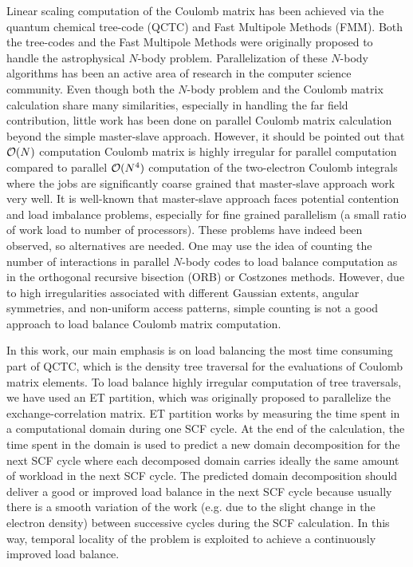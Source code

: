\commentoutA{\documentclass[prl,aps,twocolumn,twocolumngrid,superbib]{revtex4}}
\begin{document}
Linear scaling computation of the Coulomb matrix has been achieved via
the quantum chemical tree-code
(QCTC)\cite{MChallacombe96,MChallacombe96B,MChallacombe97} and Fast
Multipole Methods (FMM)\cite{CWhite94B,CWhite96A,MStrain96}.  Both the
tree-codes\cite{JBarnes86} and the Fast Multipole
Methods\cite{LGreengard87,CRAnderson92} were originally proposed to
handle the astrophysical $N$-body problem.  Parallelization of these
$N$-body algorithms has been an active area of research in the
computer science
community\cite{MWarren92,AGrama94,MWarren95b,Singh93,Singh_95v27,YHu96,Grama_98v24,PGibbon02,Antonuccio-Delogu03}.
Even though both the $N$-body problem and the Coulomb matrix
calculation share many similarities, especially in handling the far
field contribution, little work has been done on parallel Coulomb
matrix calculation beyond the simple master-slave
approach\cite{Sosa_98v19,Furlani_00v128,Sosa_00v26}.  However, it
should be pointed out that ${\cal O}(N)$ computation Coulomb matrix is
highly irregular for parallel computation compared to parallel ${\cal
O}(N^4)$ computation of the two-electron Coulomb integrals where the
jobs are significantly coarse grained that master-slave approach work
very well.  It is well-known that master-slave approach faces
potential contention and load imbalance
problems\cite{BWilkinson99,GWilson95}, especially for fine grained
parallelism (a small ratio of work load to number of processors).
These problems have indeed been observed\cite{Guerra_95,CGan03}, so
alternatives are needed.  One may use the idea of counting the number
of interactions in parallel $N$-body codes to load balance computation
as in the orthogonal recursive bisection (ORB) or Costzones
methods\cite{MWarren95b,Singh93,Singh_95v27,MWarren93}.  However, due
to high irregularities associated with different Gaussian extents,
angular symmetries, and non-uniform access patterns, simple counting
is not a good approach to load balance Coulomb matrix computation.

In this work, our main emphasis is on load balancing the most time
consuming part of QCTC, which is the density tree traversal for the
evaluations of Coulomb matrix elements. To load balance highly
irregular computation of tree traversals, we have used an ET
partition\cite{CGan03}, which was originally proposed to parallelize
the exchange-correlation matrix.  ET partition works by measuring the
time spent in a computational domain during one SCF cycle. At the end
of the calculation, the time spent in the domain is used to predict a
new domain decomposition for the next SCF cycle where each decomposed
domain carries ideally the same amount of workload in the next SCF
cycle. The predicted domain decomposition should deliver a good or
improved load balance in the next SCF cycle because usually there is a
smooth variation of the work (e.g. due to the slight change in the
electron density) between successive cycles during the SCF
calculation.  In this way, temporal locality\cite{JPilkington96} of
the problem is exploited to achieve a continuously improved load
balance.
\end{document}
